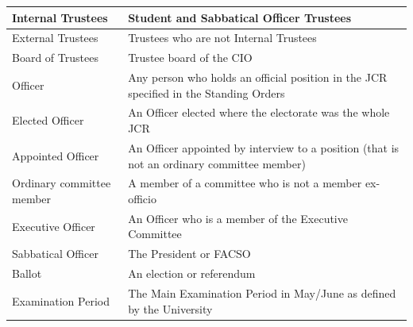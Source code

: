 \documentclass[12pt]{article}
\begin{document}
\begin{enumerate}
\begin{tabular}{|p{1.5in}|p{3.8in}|}
    Internal Trustees		& Student and Sabbatical Officer Trustees\\\hline
    External Trustees		& Trustees who are not Internal Trustees\\\hline
    Board of Trustees		& Trustee board of the CIO\\\hline
    Officer                 & Any person who holds an official position in the JCR specified in the Standing Orders\\ \hline
    Elected Officer         & An Officer elected where the electorate was the whole JCR \\ \hline
    Appointed Officer       & An Officer appointed by interview to a position (that is not an ordinary committee member) \\ \hline
    Ordinary committee member & A member of a committee who is not a member ex-officio \\ \hline
    Executive Officer       & An Officer who is a member of the Executive Committee \\ \hline
    Sabbatical Officer		& The President or FACSO\\\hline
    Ballot                  & An election or referendum \\ \hline
    Examination Period      & The Main Examination Period in May/June as defined by the University\\\hline
\end{tabular}
\end{enumerate}
\end{document}
